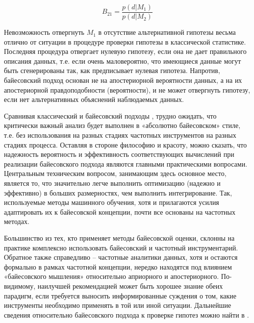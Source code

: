 \begin{equation}
B_{21} = \frac{p(d|M_1)}{p(d|M_2)}  
\end{equation}

Невозможность отвергнуть $M_1$ в отсутствие альтернативной гипотезы весьма отлично от ситуации в процедуре проверки 
гипотезы в классической статистике. Последняя процедура отвергает нулевую гипотезу, если она не дает правильного 
описания данных, т.е. если очень маловероятно, что имеющиеся данные могут быть сгенерированы так, как предписывает 
нулевая гипотеза. Напротив, байесовский подход основан не на апостериорной вероятности данных, а на их апостериорной 
правдоподобности (вероятности), и не может отвергнуть гипотезу, если нет альтернативных объяснений наблюдаемых данных.

Сравнивая классический и байесовский подходы \cite{ivezic2019statistics}, трудно ожидать, что критически важный анализ 
будет выполнен в «абсолютно байесовском» стиле, т.е. без использования на разных стадиях частотных инструментов на 
разных стадиях процесса. Оставляя в стороне философию и красоту, можно сказать, что надежность вероятность и 
эффективность соответствующих вычислений при реализации байесовского подхода являются главными практическими вопросами. 
Центральным техническим вопросом, занимающим здесь основное место, является то, что значительно легче выполнить 
оптимизацию (надежно и эффективно) в больших размерностях, чем выполнить интегрирование. Так, используемые методы 
машинного обучения, хотя и прилагаются усилия адаптировать их к байесовской концепции, почти все основаны на 
частотных методах. 

Большинство из тех, кто применяет методы байесовской оценки, склонны на практике комплексно использовать байесовский 
и частотный инструментарий. Обратное также справедливо – частотные аналитики данных, хотя и остаются формально в 
рамках частотной концепции, нередко находятся под влиянием «байесовского мышления» относительно априорного и 
апостериорного. По-видимому, наилучшей рекомендацией может быть хорошее знание обеих парадигм, если требуется 
выносить информированные суждения о том, какие инструменты необходимо применять в той или иной ситуации. Дальнейшие 
сведения относительно байесовского подхода к проверке гипотез можно найти в \cite{ivezic2019statistics, sivia2006data, 
rouder2009bayesian}.

